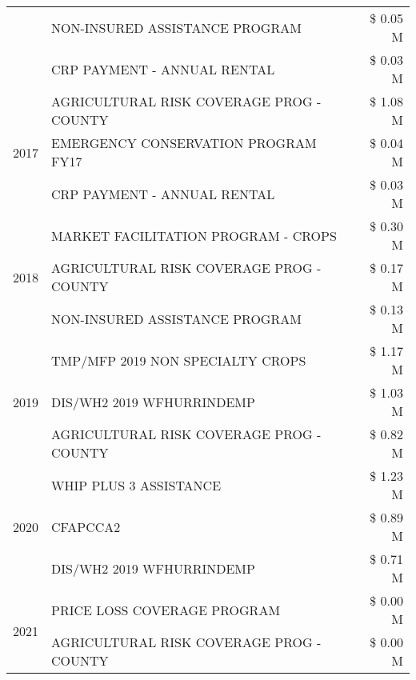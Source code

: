\begin{tabular}{llr}
 & NON-INSURED ASSISTANCE PROGRAM & \$ 0.05 M \\
 & CRP PAYMENT - ANNUAL RENTAL & \$ 0.03 M \\
\cline{1-3}
\multirow[t]{3}{*}{2017} & AGRICULTURAL RISK COVERAGE PROG - COUNTY & \$ 1.08 M \\
 & EMERGENCY CONSERVATION PROGRAM FY17 & \$ 0.04 M \\
 & CRP PAYMENT - ANNUAL RENTAL & \$ 0.03 M \\
\cline{1-3}
\multirow[t]{3}{*}{2018} & MARKET FACILITATION PROGRAM - CROPS & \$ 0.30 M \\
 & AGRICULTURAL RISK COVERAGE PROG - COUNTY & \$ 0.17 M \\
 & NON-INSURED ASSISTANCE PROGRAM & \$ 0.13 M \\
\cline{1-3}
\multirow[t]{3}{*}{2019} & TMP/MFP 2019 NON SPECIALTY CROPS & \$ 1.17 M \\
 & DIS/WH2 2019 WFHURRINDEMP & \$ 1.03 M \\
 & AGRICULTURAL RISK COVERAGE PROG - COUNTY & \$ 0.82 M \\
\cline{1-3}
\multirow[t]{3}{*}{2020} & WHIP PLUS 3 ASSISTANCE & \$ 1.23 M \\
 & CFAPCCA2 & \$ 0.89 M \\
 & DIS/WH2 2019 WFHURRINDEMP & \$ 0.71 M \\
\cline{1-3}
\multirow[t]{2}{*}{2021} & PRICE LOSS COVERAGE PROGRAM & \$ 0.00 M \\
 & AGRICULTURAL RISK COVERAGE PROG - COUNTY & \$ 0.00 M \\
\cline{1-3}
\bottomrule
\end{tabular}
